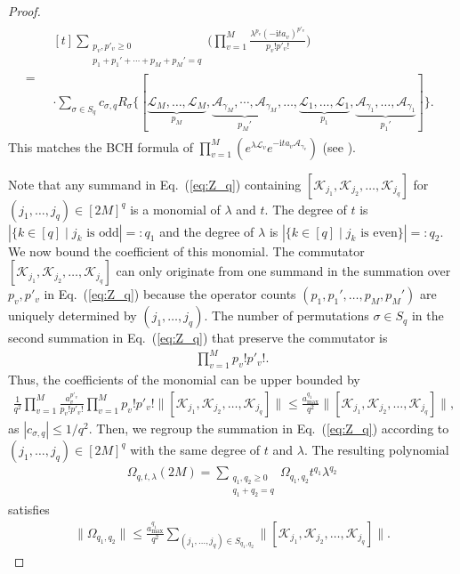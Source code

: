 \documentclass[11pt]{article}
\newcommand{\eq}[1]{(\ref{eq:#1})}
\renewcommand{\i}{\mathrm{i}}
\newcommand{\A}{\mathcal{A}}
\newcommand{\mc}{\mathcal}
\begin{document}
\begin{proof}
\begin{align}
        =~& \begin{multlined}[t]
            \sum_{\substack{p_v,p'_v\ge 0\\ p_1+p_1'+\cdots+p_M+p_M'=q }}\bigg(\prod_{v=1}^M \frac{\lambda^{p_v}(-\i ta_v)^{p'_v}}{p_v!p'_v!} \bigg) \\ 
        \cdot \sum_{\sigma\in S_q} c_{\sigma, q}R_{\sigma}\big\{[\underbrace{\mc L_M, \ldots,\mc L_M}_{p_M}, \underbrace{\A_{\gamma_M}, \cdots, \mc A_{\gamma_M}}_{p_M'},  \ldots, \underbrace{ \mc L_1,  \ldots, \mc L_1}_{p_1}, \underbrace{\A_{\gamma_1},  \ldots, \mc A_{\gamma_1}}_{p_1'}]\big\}.\label{eq:Z_q}\end{multlined}
    \end{align}
    This matches the BCH formula of $\prod_{v=1}^M\left( e^{\lambda \mc L_{v}} e^{-\i t a_{v} \A_{\gamma_v}} \right)$ (see \citet[Section 3.1]{aftab2024multi}). 
    
    Note that any summand in Eq.~\eq{Z_q} containing $[\mc K_{j_1}, \mc K_{j_2}, \ldots, \mc K_{j_q}]$ for $(j_1, \ldots, j_q)\in [2M]^q$ is a monomial of $\lambda$ and $t$. The degree of $t$ is $|\{k\in [q]\mid j_k \text{ is  odd}|=: q_1$ and the degree of $\lambda$ is $|\{k\in [q]\mid j_k \text{ is  even}\}|=: q_2$. We now bound the coefficient of this monomial. The commutator $[\mc K_{j_1}, \mc K_{j_2}, \ldots, \mc K_{j_q}]$ can only originate from one summand in the summation over $p_v, p'_v$ in Eq.~\eq{Z_q} because the operator counts $(p_1, p_1', \ldots, p_M, p_M')$ are uniquely determined by $(j_1, \ldots, j_q)$. The number of permutations $\sigma\in S_q$ in the second summation in Eq.~\eq{Z_q} that preserve the commutator is \begin{align*}
        \prod_{v=1}^M p_v!p'_v!.
    \end{align*} Thus, the coefficients of the monomial can be upper bounded by \begin{align*}
        \frac{1}{q^2}\prod_{v=1}^M \frac{a_v^{p'_v}}{p_v!p'_v!}\prod_{v=1}^M p_v!p'_v!\big\|[\mc K_{j_1}, \mc K_{j_2}, \ldots, \mc K_{j_q}]\big\| \le  \frac{a_{\max}^{q_1}}{q^2}  \big\|[\mc K_{j_1}, \mc K_{j_2}, \ldots, \mc K_{j_q}]\big\|,
    \end{align*}
    as $|c_{\sigma, q}|\le 1/q^2$. Then, we regroup the summation in Eq.~\eq{Z_q} according to $(j_1, \ldots, j_q)\in [2M]^q$ with the same degree of $t$ and $\lambda$. The resulting polynomial \begin{align*}
        \Omega_{q,t,\lambda}(2M)= \sum_{\substack{q_1, q_2 \ge 0\\q_1+q_2 = q}}\Omega_{q_1, q_2} t^{q_1}\lambda^{q_2}
    \end{align*}
    satisfies \begin{align*}
         \|\Omega_{q_1, q_2}\|\le  \frac{a_{\max}^{q_1}}{q^2}\sum_{(j_1, \ldots, j_q)\in S_{q_1, q_2}} \big\|[\mc K_{j_1}, \mc K_{j_2}, \ldots, \mc K_{j_q}]\big\|.
    \end{align*}
\end{proof}
\end{document}
